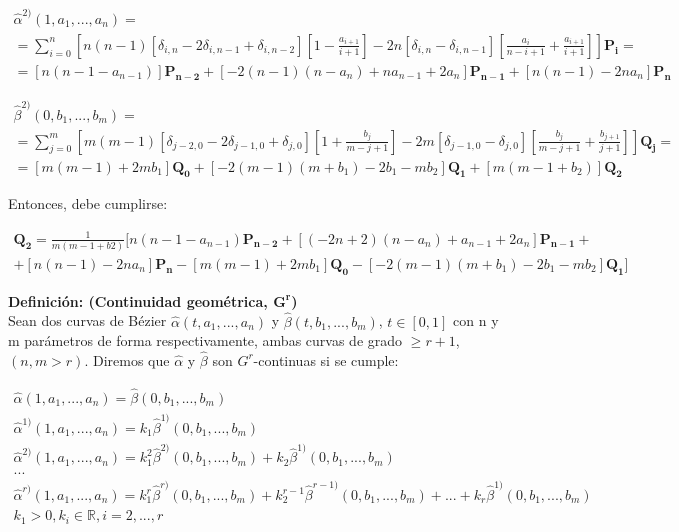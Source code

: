 \documentclass{article}
\begin{document}
\begin{gather*}
\hat{\alpha}^{2)}(1,a_1,...,a_n) = \\
= \sum_{i = 0}^n \left[ n(n-1)\left[ \delta_{i,n} -2\delta_{i,n-1} + \delta_{i,n-2} \right]\left[  1-\frac{a_{i+1}}{i+1}\right] -2n\left[\delta_{i,n} -\delta_{i,n-1} \right] \left[\frac{a_i}{n-i+1} + \frac{a_{i+1}}{i+1} \right] \right] \mathbf{P_i} = \\
= \left[n(n-1-a_{n-1}) \right]\mathbf{P_{n-2}} + \left[-2(n-1)(n-a_n) + na_{n-1} + 2a_n \right]\mathbf{P_{n-1}} + \left[ n(n-1) -2na_n \right]\mathbf{P_n}
\end{gather*}

\begin{gather*}
\hat{\beta}^{2)}(0,b_1,...,b_m) = \\
= \sum_{j = 0}^m \left[ m(m-1)\left[ \delta_{j-2,0} -2\delta_{j-1,0} + \delta_{j,0} \right]\left[  1+\frac{b_j}{m-j+1}\right] -2m\left[\delta_{j-1,0} -\delta_{j,0} \right] \left[\frac{b_j}{m-j+1} + \frac{b_{j+1}}{j+1} \right] \right] \mathbf{Q_j} = \\
= \left[ m(m-1) +2mb_1 \right]\mathbf{Q_0} + \left[ -2(m-1)(m+b_1) -2b_1 -mb_2 \right]\mathbf{Q_1} + \left[ m(m-1+b_2) \right]\mathbf{Q_2}
\end{gather*}

Entonces, debe cumplirse:

\begin{gather*}
\mathbf{Q_2} = \frac{1}{m(m-1+b2)} [ n(n-1-a_{n-1})\mathbf{P_{n-2}} + \left[ (-2n+2)(n-a_n) + a_{n-1} + 2a_n \right]\mathbf{P_{n-1}} + \\
+ \left[n(n-1) -2na_n \right]\mathbf{P_n} - \left[ m(m-1) + 2mb_1 \right]\mathbf{Q_0} -\left[ -2(m-1)(m+b_1) -2b_1 -mb_2 \right]\mathbf{Q_1} ]
\end{gather*}


\textbf{Definición: (Continuidad geométrica, $\mathbf{G^r}$)} \\

Sean dos curvas de Bézier $\hat{\alpha}(t,a_1,...,a_n)$ y $\hat{\beta}(t,b_1,...,b_m)$, $t\in[0,1]$ con n y m parámetros de forma respectivamente, ambas curvas de grado $\geq r+1$, $(n,m > r)$. Diremos que $\hat{\alpha}$ y $\hat{\beta}$ son $G^r$-continuas si se cumple:

\begin{gather*}
\hat{\alpha}(1,a_1,...,a_n) = \hat{\beta}(0,b_1,...,b_m) \\
\hat{\alpha}^{1)}(1,a_1,...,a_n) = k_1\hat{\beta}^{1)}(0,b_1,...,b_m) \\
\hat{\alpha}^{2)}(1,a_1,...,a_n) = k_1^2\hat{\beta}^{2)}(0,b_1,...,b_m) + k_2\hat{\beta}^{1)}(0,b_1,...,b_m) \\
...\\
\hat{\alpha}^{r)}(1,a_1,...,a_n) = k_1^r\hat{\beta}^{r)}(0,b_1,...,b_m) + k_2^{r-1}\hat{\beta}^{r-1)}(0,b_1,...,b_m)+...+k_r\hat{\beta}^{1)}(0,b_1,...,b_m) \\
k_1 > 0, k_i \in \mathbb{R}, i=2,...,r
\end{gather*}
\end{document}

